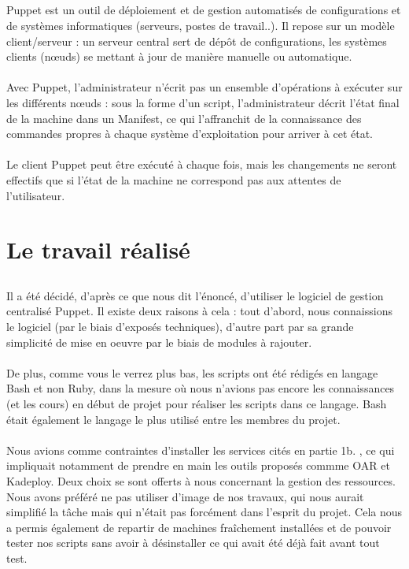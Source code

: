 \documentclass[a4paper, 10pt, onecolumn]{report}
\begin{document}
\section{}
Puppet est un outil de déploiement et de gestion automatisés de configurations et de systèmes
informatiques (serveurs, postes de travail..). Il repose sur un modèle client/serveur : un serveur 
central sert de dépôt de configurations, les systèmes clients (nœuds) se mettant à jour de manière 
manuelle ou automatique.\\
\\
Avec Puppet, l’administrateur n’écrit pas un ensemble d’opérations à exécuter sur les différents
nœuds : sous la forme d’un script, l’administrateur décrit l'état final de la machine dans un
Manifest, ce qui l’affranchit de la connaissance des commandes propres à chaque système
d'exploitation pour arriver à cet état.\\
\\
Le client Puppet peut être exécuté à chaque fois, mais les
changements ne seront effectifs que si l'état de la machine ne correspond pas aux attentes de
l'utilisateur.

\chapter{Le travail réalisé}
\section{}
Il a été décidé, d’après ce que nous dit l’énoncé, d’utiliser le logiciel de gestion centralisé
Puppet. Il existe deux raisons à cela : tout d’abord, nous connaissions le logiciel (par le biais
d’exposés techniques), d’autre part par sa grande simplicité de mise en oeuvre par le biais de
modules à rajouter.\\
\\
De plus, comme vous le verrez plus bas, les scripts ont été rédigés en langage Bash
et non Ruby, dans la mesure où nous n’avions pas encore les connaissances (et les cours) en
début de projet pour réaliser les scripts dans ce langage. Bash était également le langage le
plus utilisé entre les membres du projet.\\
\\
Nous avions comme contraintes d’installer les services cités en partie 1b. , ce qui
impliquait notamment de prendre en main les outils proposés commme OAR et Kadeploy.
Deux choix se sont offerts à nous concernant la gestion des ressources. Nous avons
préféré ne pas utiliser d’image de nos travaux, qui nous aurait simplifié la tâche mais qui n’était
pas forcément dans l’esprit du projet. Cela nous a permis également de repartir de machines
fraîchement installées et de pouvoir tester nos scripts sans avoir à désinstaller ce qui avait été
déjà fait avant tout test.
\end{document}
